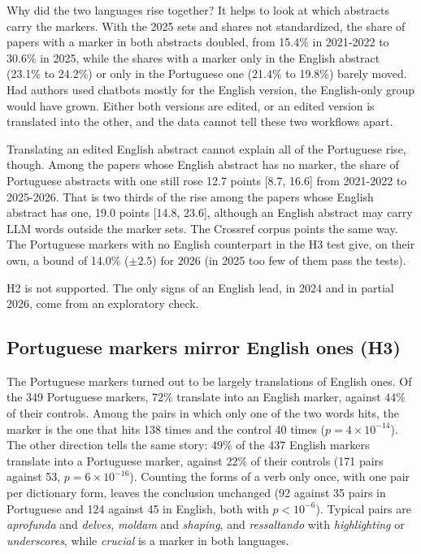 \documentclass[12pt]{article}
\newcommand{\w}[1]{\textit{#1}}
\begin{document}
Why did the two languages rise together? It helps to look at which abstracts carry the markers. With
the 2025 sets and shares not standardized, the share of papers with a marker in both abstracts
doubled, from 15.4\% in 2021-2022 to 30.6\% in 2025, while the shares with a marker only in the
English abstract (23.1\% to 24.2\%) or only in the Portuguese one (21.4\% to 19.8\%) barely moved.
Had authors used chatbots mostly for the English version, the English-only group would have grown.
Either both versions are edited, or an edited version is translated into the other, and the data
cannot tell these two workflows apart.

Translating an edited English abstract cannot explain all of the Portuguese rise, though. Among the
papers whose English abstract has no marker, the share of Portuguese abstracts with one still rose
12.7 points [8.7, 16.6] from 2021-2022 to 2025-2026. That is two thirds of the rise among the papers
whose English abstract has one, 19.0 points [14.8, 23.6], although an English abstract may carry LLM
words outside the marker sets. The Crossref corpus points the same way. The Portuguese markers with
no English counterpart in the H3 test give, on their own, a bound of 14.0\% ($\pm 2.5$) for 2026 (in
2025 too few of them pass the tests).

H2 is not supported. The only signs of an English lead, in 2024 and in partial 2026, come from an
exploratory check.

\subsection{Portuguese markers mirror English ones (H3)}
\label{sec:h3}

The Portuguese markers turned out to be largely translations of English ones. Of the 349 Portuguese
markers, 72\% translate into an English marker, against 44\% of their controls. Among the pairs in
which only one of the two words hits, the marker is the one that hits 138 times and the control 40
times ($p = 4 \times 10^{-14}$). The other direction tells the same story: 49\% of the 437 English
markers translate into a Portuguese marker, against 22\% of their controls (171 pairs against 53,
$p = 6 \times 10^{-16}$). Counting the forms of a verb only once, with one pair per dictionary form,
leaves the conclusion unchanged (92 against 35 pairs in Portuguese and 124 against 45 in English,
both with $p < 10^{-6}$). Typical pairs are \w{aprofunda} and \w{delves}, \w{moldam} and
\w{shaping}, and \w{ressaltando} with \w{highlighting} or \w{underscores}, while \w{crucial} is a
marker in both languages.
\end{document}
